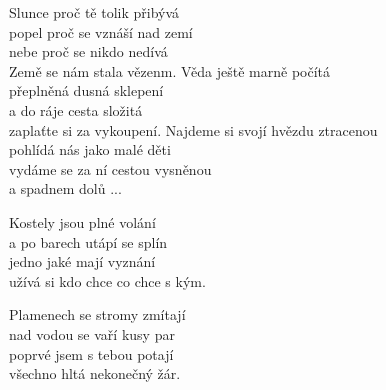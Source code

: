 
\ve 
{}Slunce proč tě tolik přibývá\\
popel proč se vznáší nad zemí\\
nebe proč se nikdo nedívá\\
Země se nám stala vězenm.
\ve
Věda ještě marně počítá\\
přeplněná dusná sklepení\\
a do ráje cesta složitá\\
zaplaťte si za vykoupení.
\cho
{}Najdeme si svojí hvězdu ztracenou \\
pohlídá nás jako malé děti\\
vydáme se za ní cestou vysněnou\\
a spadnem dolů ... 

\ve
Kostely jsou plné volání\\
a po barech utápí se splín\\
jedno jaké mají vyznání\\
užívá si kdo chce co chce s kým.

\ve
Plamenech se stromy zmítají\\ 
nad vodou se vaří kusy par\\
poprvé jsem s tebou potají \\
všechno hltá nekonečný žár.
\esong

